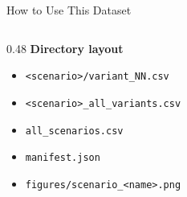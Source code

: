 \documentclass[aspectratio=169,11pt]{beamer}
\begin{document}
\begin{frame}{How to Use This Dataset}
\begin{columns}[T]
\begin{column}{0.48\textwidth}
      \bigskip
      \textbf{Directory layout}
      {\small
      \begin{itemize}
        \item[] \texttt{<scenario>/variant\_NN.csv}
        \item[] \texttt{<scenario>\_all\_variants.csv}
        \item[] \texttt{all\_scenarios.csv}
        \item[] \texttt{manifest.json}
        \item[] \texttt{figures/scenario\_<name>.png}
      \end{itemize}
      }
    \end{column}
  \end{columns}
\end{frame}

\end{document}
